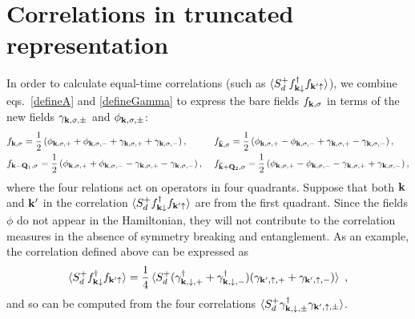\documentclass[%
reprint,
superscriptaddress,
groupedaddress,
superscriptaddress,
onecolumn,
]{revtex4-2}
\begin{document}
\section{Correlations in truncated representation}
In order to calculate equal-time correlations (such as \(\braket{S_d^+ f^\dagger_{{\bf k}\downarrow}f_{{\bf k}^\prime \uparrow}} \)), we combine eqs.~\ref{defineA} and \ref{defineGamma} to express the bare fields \(f_{{\bf k},\sigma}\) in terms of the new fields \(\gamma_{{\bf k},\sigma,\pm}\) and \(\phi_{{\bf k},\sigma,\pm}\):
\begin{equation}\begin{aligned}
	&f_{{\bf k},\sigma} = \frac{1}{2}\left(\phi_{{\bf k},\sigma,+} + \phi_{{\bf k},\sigma,-} + \gamma_{{\bf k},\sigma,+} + \gamma_{{\bf k},\sigma,-}\right), ~ &&f_{{\bf \bar k},\sigma} = \frac{1}{2}\left(\phi_{{\bf k},\sigma,+} - \phi_{{\bf k},\sigma,-} + \gamma_{{\bf k},\sigma,+} - \gamma_{{\bf k},\sigma,-}\right),\\
	&f_{{\bf k} - {\bf Q}_1,\sigma} = \frac{1}{2}\left(\phi_{{\bf k},\sigma,+} + \phi_{{\bf k},\sigma,-} - \gamma_{{\bf k},\sigma,+} - \gamma_{{\bf k},\sigma,-}\right),~ &&f_{{\bf \bar k} + {\bf Q}_2,\sigma} = \frac{1}{2}\left(\phi_{{\bf k},\sigma,+} - \phi_{{\bf k},\sigma,-} - \gamma_{{\bf k},\sigma,+} + \gamma_{{\bf k},\sigma,-}\right),
\end{aligned}\end{equation}
where the four relations act on operators in four quadrants. Suppose that both \({\bf k}\) and \({\bf k}^\prime\) in the correlation \(\braket{S_d^+ f^\dagger_{{\bf k}\downarrow}f_{{\bf k}^\prime \uparrow}}\) are from the first quadrant. Since the fields \(\phi\) do not appear in the Hamiltonian, they will not contribute to the correlation measures in the absence of symmetry breaking and entanglement. As an example, the correlation defined above can be expressed as
\begin{equation}\begin{aligned}
	\braket{S_d^+ f^\dagger_{{\bf k}\downarrow}f_{{\bf k}^\prime \uparrow}} = \frac{1}{4}\braket{S_d^+ (\gamma^\dagger_{{\bf k},\downarrow,+} + \gamma^\dagger_{{\bf k},\downarrow,-})(\gamma_{{\bf k}^\prime,\uparrow,+} + \gamma_{{\bf k}^\prime,\uparrow,-})}~,
\end{aligned}\end{equation}
and so can be computed from the four correlations \(\braket{S_d^+ \gamma^\dagger_{{\bf k},\downarrow,\pm} \gamma_{{\bf k}^\prime,\uparrow,\pm}}\).
\end{document}
